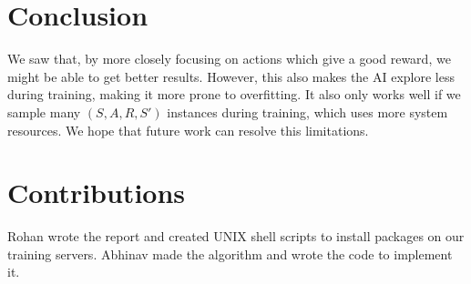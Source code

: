 \documentclass{IEEEtran}
\begin{document}
\section{Conclusion}\label{conclusion}
We saw that, by more closely focusing on actions which give a good reward, we might be able to get better results.
However, this also makes the AI explore less during training, making it more prone to overfitting.
It also only works well if we sample many $(S, A, R, S')$ instances during training, which uses more system resources.
We hope that future work can resolve this limitations.


\section{Contributions}\label{contributions}
Rohan wrote the report and created UNIX shell scripts to install packages on our training servers. 
Abhinav made the algorithm and wrote the code to implement it.

\printbibliography
\end{document}
